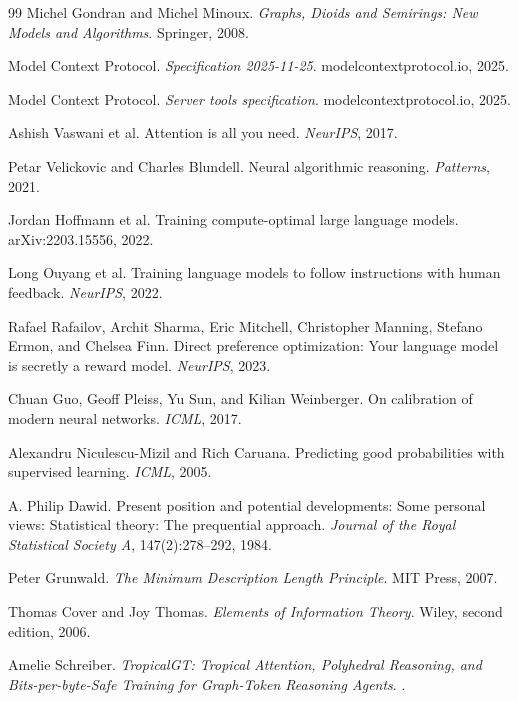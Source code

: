 \documentclass[11pt]{article}
\theoremstyle{definition}
\theoremstyle{remark}
\numberwithin{equation}{section}
\begin{document}
\begin{thebibliography}{99}
Michel Gondran and Michel Minoux.
\newblock \emph{Graphs, Dioids and Semirings: New Models and Algorithms}.
\newblock Springer, 2008.

Model Context Protocol.
\newblock \emph{Specification 2025-11-25}.
\newblock modelcontextprotocol.io, 2025.

Model Context Protocol.
\newblock \emph{Server tools specification}.
\newblock modelcontextprotocol.io, 2025.

Ashish Vaswani et al.
\newblock Attention is all you need.
\newblock \emph{NeurIPS}, 2017.

Petar Velickovic and Charles Blundell.
\newblock Neural algorithmic reasoning.
\newblock \emph{Patterns}, 2021.

Jordan Hoffmann et al.
\newblock Training compute-optimal large language models.
\newblock arXiv:2203.15556, 2022.

Long Ouyang et al.
\newblock Training language models to follow instructions with human feedback.
\newblock \emph{NeurIPS}, 2022.

Rafael Rafailov, Archit Sharma, Eric Mitchell, Christopher Manning, Stefano Ermon, and Chelsea Finn.
\newblock Direct preference optimization: Your language model is secretly a reward model.
\newblock \emph{NeurIPS}, 2023.

Chuan Guo, Geoff Pleiss, Yu Sun, and Kilian Weinberger.
\newblock On calibration of modern neural networks.
\newblock \emph{ICML}, 2017.

Alexandru Niculescu-Mizil and Rich Caruana.
\newblock Predicting good probabilities with supervised learning.
\newblock \emph{ICML}, 2005.

A. Philip Dawid.
\newblock Present position and potential developments: Some personal views: Statistical theory: The prequential approach.
\newblock \emph{Journal of the Royal Statistical Society A}, 147(2):278--292, 1984.

Peter Grunwald.
\newblock \emph{The Minimum Description Length Principle}.
\newblock MIT Press, 2007.

Thomas Cover and Joy Thomas.
\newblock \emph{Elements of Information Theory}.
\newblock Wiley, second edition, 2006.

Amelie Schreiber.
\newblock \emph{TropicalGT: Tropical Attention, Polyhedral Reasoning, and Bits-per-byte-Safe Training for Graph-Token Reasoning Agents}.
.


\end{thebibliography}
\end{document}
